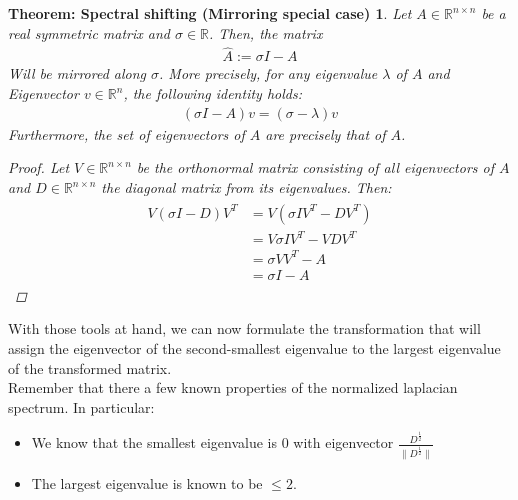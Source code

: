 \documentclass[10pt, a4paper, twocolumn]{article}
\begin{document}
    \newtheorem{shifting}[]{Theorem: Spectral shifting (Mirroring special case)}[section]
    \begin{shifting}
        Let $A \in \mathbb{R}^{n \times n}$ be a real symmetric matrix and $\sigma \in \mathbb{R}$.
        Then, the matrix
        \begin{align}
            \hat{A} := \sigma I - A
        \end{align}
        Will be mirrored along $\sigma$. More precisely, for any eigenvalue $\lambda$ of $A$ and Eigenvector
        $v \in \mathbb{R}^n$, the following identity holds:
        \begin{align}
            \left( \sigma I -A \right) v = \left( \sigma - \lambda \right) v
        \end{align}
        Furthermore, the set of eigenvectors of $\hat{A}$ are precisely that of $A$.
        \begin{proof}[Proof]
            Let $V \in \mathbb{R}^{n \times n}$ be the orthonormal matrix consisting of all eigenvectors of $A$
            and $D \in \mathbb{R}^{n \times n}$ the diagonal matrix from its eigenvalues. Then:
            \begin{align}
                \begin{split}
                    V \left( \sigma I - D \right) V^T & = V \left( \sigma I V^T - D V ^T \right) \\
                    & = V \sigma I V^T - VDV^T \\
                    & = \sigma V V^T - A \\
                    & = \sigma I -A
                \end{split}
            \end{align}
        \end{proof}
    \end{shifting}

    With those tools at hand, we can now formulate the transformation that will assign the eigenvector of the
    second-smallest eigenvalue to the largest eigenvalue of the transformed matrix.
    \\
    Remember that there a few known properties of the normalized laplacian spectrum. In particular:
    \begin{itemize}
        \item We know that the smallest eigenvalue is $0$ with eigenvector $\frac{D^\frac{1}{2}}{\lVert D^\frac{1}{2} \rVert}$ %
        \item The largest eigenvalue is known to be $ \leq 2$.
    \end{itemize}
\end{document}
